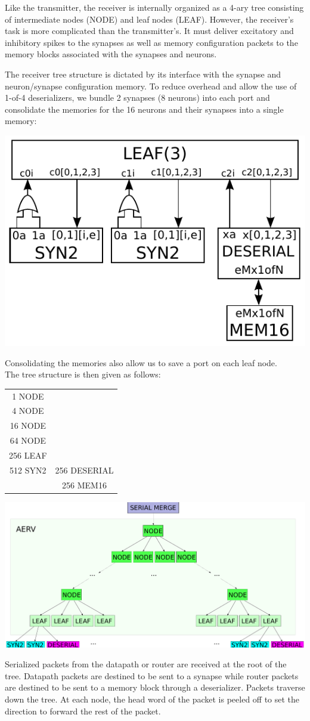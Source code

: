 \documentclass{article}
\begin{document}
Like the transmitter, the receiver is internally organized as a 4-ary tree
consisting of intermediate nodes (NODE) and leaf nodes (LEAF).
However, the receiver's task is more complicated than the transmitter's.
It must deliver excitatory and inhibitory spikes to the synapses
as well as memory configuration packets to the memory blocks associated with
the synapses and neurons.

The receiver tree structure is dictated by its interface with the synapse
and neuron/synapse configuration memory. 
To reduce overhead and allow the use of 1-of-4 deserializers, we bundle 
2 synapses (8 neurons) into each port and consolidate the memories for the 
16 neurons and their synapses into a single memory:

\begin{center}
  \includegraphics[width=.4\textwidth]{img/recv_nrn_interface_2syn2_1mem16.pdf}
\end{center}

\noindent
Consolidating the memories also allow us to save a port on each leaf node. \\
The tree structure is then given as follows:

\begin{center}
    \begin{tabular}{cc}
        1 NODE & \\
        4 NODE & \\
        16 NODE & \\
        64 NODE & \\
        256 LEAF & \\
        512 SYN2 & 256 DESERIAL \\
        & 256 MEM16 \\
    \end{tabular}
\end{center}

\begin{center}
  \includegraphics[width=.7\textwidth]{img/aerv.pdf}
\end{center}
Serialized packets from the datapath or router are received at the root of the tree.
Datapath packets are destined to be sent to a synapse while router packets
are destined to be sent to a memory block through a deserializer. Packets
traverse down the tree. At each node, the head word of the packet is peeled
off to set the direction to forward the rest of the packet.
\end{document}
